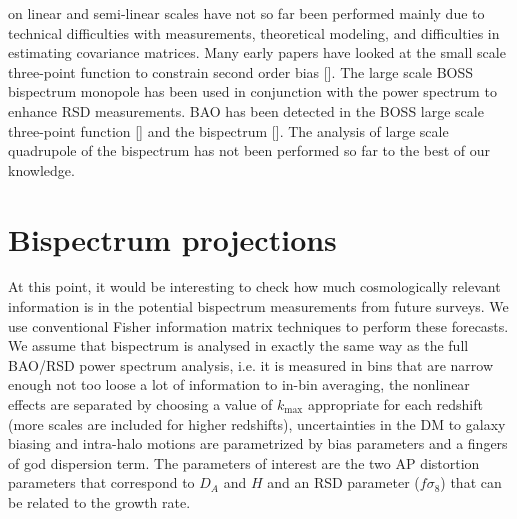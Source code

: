 on linear and semi-linear scales have not so far been performed mainly due to
technical difficulties with measurements, theoretical modeling, and
difficulties in estimating covariance matrices. Many early papers have looked
at the small scale three-point function to constrain second order bias []. The
large scale BOSS bispectrum monopole has been used in conjunction with the
power spectrum to enhance RSD measurements. BAO has been detected in the BOSS
large scale three-point function [] and the bispectrum []. The analysis of
large scale quadrupole of the bispectrum has not been performed so far to the
best of our knowledge.

\section{Bispectrum projections}

At this point, it would be interesting to check how much cosmologically
relevant information is in the potential bispectrum measurements from future
surveys. We use conventional Fisher information matrix techniques to perform
these forecasts. We assume that bispectrum is analysed in exactly the same way
as the full BAO/RSD power spectrum analysis, i.e. it is measured in bins that
are narrow enough not too loose a lot of information to in-bin averaging, the
nonlinear effects are separated by choosing a value of $k_\mathrm{max}$
appropriate for each redshift (more scales are included for higher redshifts),
uncertainties in the DM to galaxy biasing and intra-halo motions are
parametrized by bias parameters and a fingers of god dispersion term. The
parameters of interest are the two AP distortion parameters that correspond to
$D_A$ and $H$ and an RSD parameter ($f\sigma_8$) that can be related to the
growth rate.

